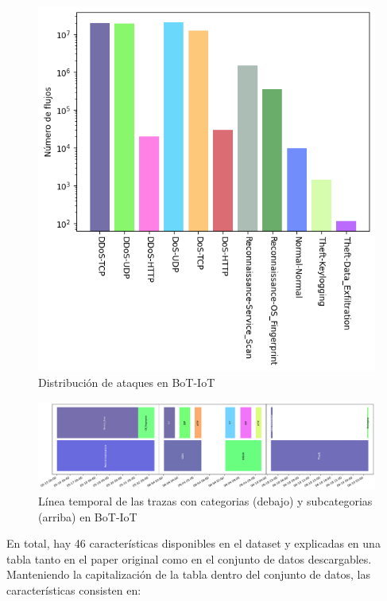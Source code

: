 \begin{figure}[H]
    \begin{center}
        \includegraphics[width=0.49\linewidth]{media/botiot_csv_day_results.png}
    \end{center}
    \captionsetup{justification=centering}
    \caption{Distribución de ataques en BoT-IoT}\label{fig:botiot_results}
\end{figure}

\begin{figure}[!htb]
    \begin{center}
        \includegraphics[width=1\linewidth]{media/botiot_csv_timeline.png}
    \end{center}
    \captionsetup{justification=centering}
    \caption{Línea temporal de las trazas con categorias (debajo) y subcategorias (arriba) en BoT-IoT}\label{fig:botiot_timeline}
\end{figure}

En total, hay 46 características disponibles en el dataset y explicadas en una tabla tanto en el paper original como en el conjunto de datos descargables. Manteniendo la capitalización de la tabla dentro del conjunto de datos, las características consisten en:

